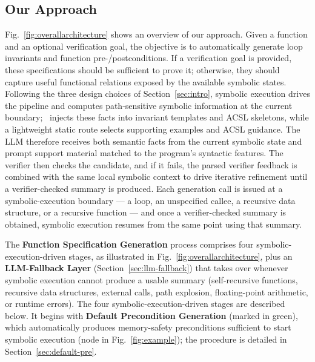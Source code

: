 \subsection{Our Approach} 




\DIFaddbegin
Fig.~\ref{fig:overallarchitecture} shows an overview of our approach. Given a function and an optional verification goal, the objective is to automatically generate loop invariants and function pre-/postconditions. If a verification goal is provided, these specifications should be sufficient to prove it; otherwise, they should capture useful functional relations exposed by the available symbolic states.
Following the three design choices of Section~\ref{sec:intro}, symbolic execution drives the pipeline and computes path-sensitive symbolic information at the current boundary; \toolname\ injects these facts into invariant templates and ACSL skeletons, while a lightweight static route selects supporting examples and ACSL guidance. The LLM therefore receives both semantic facts from the current symbolic state and prompt support material matched to the program's syntactic features. The verifier then checks the candidate, and if it fails, the parsed verifier feedback is combined with the same local symbolic context to drive iterative refinement until a verifier-checked summary is produced. Each generation call is issued at a symbolic-execution boundary --- a loop, an unspecified callee, a recursive data structure, or a recursive function --- and once a verifier-checked summary is obtained, symbolic execution resumes from the same point using that summary.
\DIFaddend

 

 
\DIFaddbegin
The \textbf{Function Specification Generation} process comprises four symbolic-execution-driven stages, as illustrated in Fig.~\ref{fig:overallarchitecture}, plus an \textbf{LLM-Fallback Layer} (Section~\ref{sec:llm-fallback}) that takes over whenever symbolic execution cannot produce a usable summary (self-recursive functions, recursive data structures, external calls, path explosion, floating-point arithmetic, or runtime errors). The four symbolic-execution-driven stages are described below. It begins with \textbf{Default Precondition Generation} (marked in green), which automatically produces memory-safety preconditions sufficient to start symbolic execution (node  in Fig.~\ref{fig:example}); the procedure is detailed in Section~\ref{sec:default-pre}.
\DIFaddend
 

